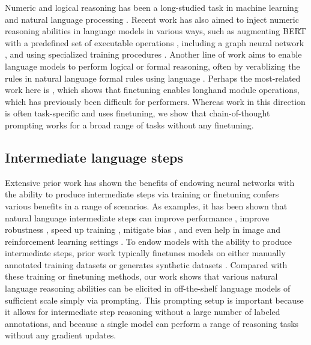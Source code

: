 \documentclass[]{article}
\theoremstyle{plain}
\theoremstyle{definition}
\theoremstyle{remark}
\begin{document}
Numeric and logical reasoning has been a long-studied task in machine learning and natural language processing \citep[][\textit{inter alia}]{lev-etal-2004-solving}.
Recent work has also aimed to inject numeric reasoning abilities in language models in various ways, such as augmenting BERT with a predefined set of executable operations \citep{andor-etal-2019-giving}, including a graph neural network \citep{ran-etal-2019-numnet}, and using specialized training procedures \citep{piekos-etal-2021-measuring}.
Another line of work aims to enable language models to perform logical or formal reasoning, often by verablizing the rules in natural language 
formal rules using language \citep{clark2020transformers,saeed-etal-2021-rulebert,liang-etal-2021-explainable}.
Perhaps the most-related work here is \citet{recchia2021teaching}, which shows that finetuning enables longhand module operations, which has previously been difficult for performers.
Whereas work in this direction is often task-specific and uses finetuning, we show that chain-of-thought prompting works for a broad range of tasks without any finetuning.

\subsection{Intermediate language steps}

Extensive prior work has shown the benefits of endowing neural networks with the ability to produce intermediate steps via training or finetuning confers various benefits in a range of scenarios.
As examples, it has been shown that natural language intermediate steps can
improve performance \citep{zaidan-etal-2007-using,yao2021refining,hase2021can,gu2021dream}, 
improve robustness \citep{chen2022can},
speed up training \citep{hancock-etal-2018-training},
mitigate bias \citep{dua-etal-2020-benefits}, 
and even help in image and reinforcement learning settings \citep{andreas-etal-2018-learning}.
To endow models with the ability to produce intermediate steps, prior work typically finetunes models on either manually annotated training datasets \citep[][\textit{inter alia}]{camburu2018snli,rajani-etal-2019-explain} or generates synthetic datasets \citep{talmor2020leap,zelikman2022star}.
Compared with these training or finetuning methods, our work shows that various natural language reasoning abilities can be elicited in off-the-shelf language models of sufficient scale simply via prompting.
This prompting setup is important because it allows for intermediate step reasoning without a large number of labeled annotations, and because a single model can perform a range of reasoning tasks without any gradient updates.
\end{document}
